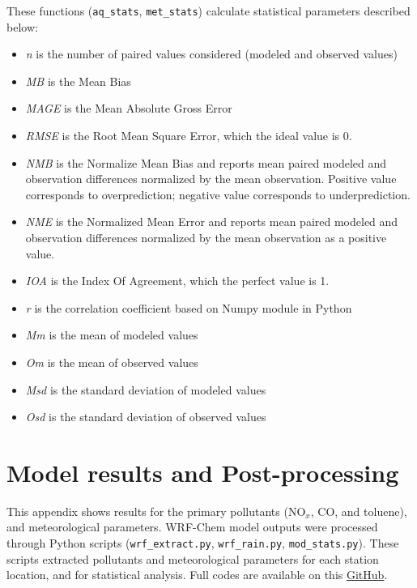   These functions (\verb|aq_stats|, \verb|met_stats|) calculate statistical parameters described below:
  
  \begin{itemize}
  	\item \textit{n} is the number of paired values considered (modeled and observed values)
  	\item \textit{MB} is the Mean Bias
  	\item \textit{MAGE} is the Mean Absolute Gross Error
  	\item \textit{RMSE} is the Root Mean Square Error, which the ideal value is 0.
  	\item \textit{NMB} is the Normalize Mean Bias and reports mean paired modeled and observation differences normalized by the mean observation. Positive value corresponds to overprediction; negative value corresponds to underprediction.
  	\item \textit{NME} is the Normalized Mean Error and reports mean paired modeled and observation differences normalized by the mean observation as a positive value.
  	\item \textit{IOA} is the Index Of Agreement, which the perfect value is 1.
  	\item \textit{r} is the correlation coefficient based on Numpy module in Python
  	\item \textit{Mm} is the mean of modeled values
  	\item \textit{Om} is the mean of observed values
  	\item \textit{Msd} is the standard deviation of modeled values
  	\item \textit{Osd} is the standard deviation of observed values
  \end{itemize}
  
  \chapter{Model results and Post-processing}\label{ap:res}
  This appendix shows results for the primary pollutants (NO$_x$, CO, and toluene), and meteorological parameters.
  WRF-Chem model outputs were processed through Python scripts (\verb|wrf_extract.py|, \verb|wrf_rain.py|, \verb|mod_stats.py|).
  These scripts extracted pollutants and meteorological parameters for each station location, and for statistical analysis.
  Full codes are available on this \href{https://github.com/adelgadop/Master_dissertation/tree/main/04_wrfchem_scripts}{GitHub}.
  
